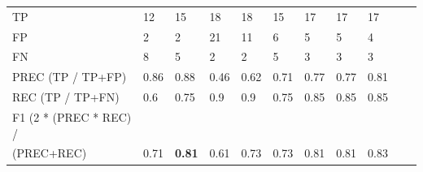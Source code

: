 \documentclass{beamer}
\begin{document}
\begin{frame}
\begin{table}[]
{\begin{tabular}{l|llllllllll}
            TP & 12 & 15 & 18 & 18 & 15 & 17 & 17 & 17 \\
            FP & 2 & 2 & 21 & 11 & 6 & 5 & 5 & 4 \\
            FN & 8 & 5 & 2 & 2 & 5 & 3 & 3 & 3  \\
            PREC (TP / TP+FP) & 0.86 &  0.88 & 0.46 & 0.62 & 0.71 & 0.77 & 0.77 & 0.81 \\
            REC (TP / TP+FN) & 0.6 &  0.75 & 0.9 & 0.9 & 0.75 & 0.85 & 0.85 & 0.85 \\
            F1 (2 * (PREC * REC) / \\(PREC+REC) & 0.71 & \textbf{0.81} & 0.61 & 0.73 & 0.73 & 0.81 & 0.81 & 0.83 
            \end{tabular}
         }
      \end{table}



\end{frame}
\end{document}

